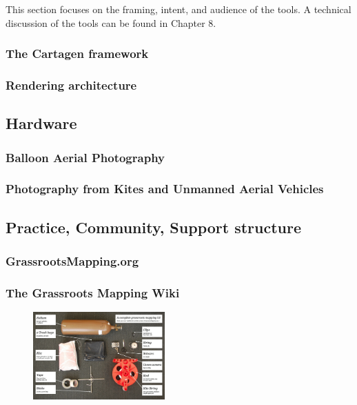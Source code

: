 \documentclass[11pt]{report}
\begin{document}
This section focuses on the framing, intent, and audience of the tools. A technical discussion of the tools can be found in Chapter 8. 

\subsubsection{The Cartagen framework}
\subsubsection*{Rendering architecture}
\subsection{Hardware}
\subsubsection{Balloon Aerial Photography}
\subsubsection{Photography from Kites and Unmanned Aerial Vehicles}
\subsection{Practice, Community, Support structure}
\subsubsection{GrassrootsMapping.org}
\subsubsection*{The Grassroots Mapping Wiki}
\begin{figure}
	\begin{flushright}
		\includegraphics[width=0.45\textwidth]{images/100-dollar-satellite-poster.jpg}
	\end{flushright}
\end{figure}
\end{document}
